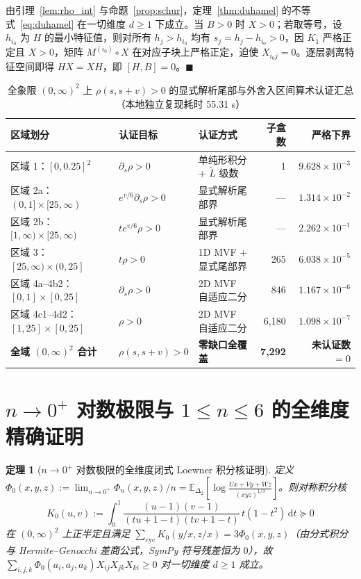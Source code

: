 \documentclass[11pt,a4paper]{article}
\newtheorem{theorem}{定理}
\theoremstyle{remark}
\begin{document}
由引理~\ref{lem:rho_int} 与命题~\ref{prop:schur}，定理~\ref{thm:duhamel} 的不等式~\eqref{eq:duhamel} 在一切维度 $d\ge 1$ 下成立。当 $B > 0$ 时 $X > 0$；若取等号，设 $h_{i_0}$ 为 $H$ 的最小特征值，则对所有 $h_j > h_{i_0}$ 均有 $s_j = h_j - h_{i_0} > 0$，因 $K_1$ 严格正定且 $X > 0$，矩阵 $M^{(i_0)}\circ X$ 在对应子块上严格正定，迫使 $X_{i_0 j} = 0$。逐层剥离特征空间即得 $HX = XH$，即 $[H, B] = 0$。$\blacksquare$

\begin{table}[!htbp]
\centering
\caption{全象限 $(0,\infty)^2$ 上 $\rho(s, s+v) > 0$ 的显式解析尾部与外舍入区间算术认证汇总（本地独立复现耗时 55.31 s）}
\label{tab:cert}
\begin{tabularx}{\linewidth}{lXlrr}
\toprule
区域划分 & 认证目标 & 认证方式 & 子盒数 & 严格下界 \\
\midrule
区域 1：$[0, 0.25]^2$ & $\partial_s\rho > 0$ & 单纯形积分 + $\tilde{L}$ 级数 & 1 & $9.628\times 10^{-3}$ \\
区域 2a：$(0,1]\times[25,\infty)$ & $e^{v/6}\partial_s\rho > 0$ & 显式解析尾部界 & — & $1.314\times 10^{-2}$ \\
区域 2b：$[1,\infty)\times[25,\infty)$ & $t e^{v/6}\rho > 0$ & 显式解析尾部界 & — & $2.262\times 10^{-1}$ \\
区域 3：$[25,\infty)\times(0,25]$ & $t\rho > 0$ & 1D MVF + 显式尾部界 & 265 & $6.038\times 10^{-5}$ \\
区域 4a--4b2：$[0,1]\times[0,25]$ & $\partial_s\rho > 0$ & 2D MVF 自适应二分 & 846 & $1.167\times 10^{-6}$ \\
区域 4c1--4d2：$[1,25]\times[0,25]$ & $\rho > 0$ & 2D MVF 自适应二分 & 6,180 & $1.098\times 10^{-7}$ \\
\midrule
\textbf{全域 $(0,\infty)^2$ 合计} & \textbf{$\rho(s, s+v) > 0$} & \textbf{零缺口全覆盖} & \textbf{7,292} & \textbf{未认证数 $= 0$} \\
\bottomrule
\end{tabularx}
\end{table}

\section{$n \to 0^+$ 对数极限与 $1 \le n \le 6$ 的全维度精确证明}

\begin{theorem}[$n \to 0^+$ 对数极限的全维度闭式 Loewner 积分核证明]\label{thm:phi0}
定义 $\Phi_0(x,y,z) := \lim_{n\to 0^+}\Phi_n(x,y,z)/n = \mathbb{E}_{\Delta_2}[\log\frac{Ux+Vy+Wz}{(xyz)^{1/3}}]$。则对称积分核
\[
K_0(u, v) := \int_0^1 \frac{(u-1)(v-1)}{(tu+1-t)(tv+1-t)}\,t(1-t^2)\,\mathrm{d}t \succeq 0
\]
在 $(0,\infty)^2$ 上正半定且满足 $\sum_{\mathrm{cyc}} K_0(y/x, z/x) = 3\Phi_0(x,y,z)$（由分式积分与 Hermite--Genocchi 差商公式，SymPy 符号残差恒为 $0$），故 $\sum_{i,j,k}\Phi_0(a_i,a_j,a_k) X_{ij}X_{jk}X_{ki} \ge 0$ 对一切维度 $d\ge 1$ 成立。
\end{theorem}
\end{document}
